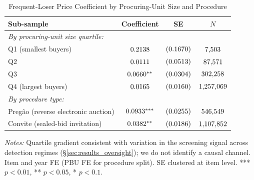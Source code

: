 \begin{table}[htbp]
\centering
\caption{Frequent-Loser Price Coefficient by Procuring-Unit Size and Procedure}
\label{tab:regime_oversight}
\begin{threeparttable}
\small
\begin{tabular}{lccc}
\toprule
Sub-sample & Coefficient & SE & $N$ \\
\midrule
\textit{By procuring-unit size quartile:} & & & \\
\quad Q1 (smallest buyers)         & $0.2138$    & $(0.1670)$    & $7{,}503$ \\
\quad Q2                           & $0.0111$    & $(0.0513)$    & $87{,}571$ \\
\quad Q3                           & $0.0660^{**}$  & $(0.0304)$  & $302{,}258$ \\
\quad Q4 (largest buyers)          & $0.0165$   & $(0.0160)$   & $1{,}257{,}069$ \\
\midrule
\textit{By procedure type:} & & & \\
\quad Preg\~ao (reverse electronic auction) & $0.0933^{***}$  & $(0.0255)$  & $546{,}549$ \\
\quad Convite (sealed-bid invitation)       & $0.0382^{**}$ & $(0.0186)$ & $1{,}107{,}852$ \\
\bottomrule
\end{tabular}
\begin{tablenotes}
\footnotesize
\item \textit{Notes:} Quartile gradient consistent with variation in
the screening signal across detection regimes
(\S\ref{sec:results_oversight}); we do not identify a causal channel.
Item and year FE (PBU FE for procedure split). SE clustered at item
level. *** $p<0.01$, ** $p<0.05$, * $p<0.1$.
\end{tablenotes}
\end{threeparttable}
\end{table}
